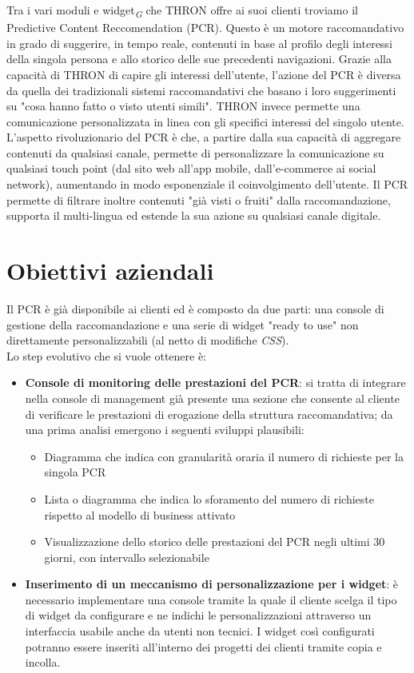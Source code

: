\documentclass[a4paper, 12pt, twoside, openright]{book}
\newcommand{\gloss}[1]{#1\textsubscript{\textit{\tiny{G}}}}
\begin{document}
Tra i vari moduli e \gloss{widget} che THRON offre ai suoi clienti troviamo il Predictive Content Reccomendation (PCR). Questo è un motore raccomandativo in grado di suggerire, in tempo reale, contenuti in base al profilo degli interessi della singola persona e allo storico delle sue precedenti navigazioni. Grazie alla capacità di THRON di capire gli interessi dell'utente, l'azione del PCR è diversa da quella dei tradizionali sistemi raccomandativi che basano i loro suggerimenti su "cosa hanno fatto o visto utenti simili". THRON invece permette una comunicazione personalizzata in linea con gli specifici interessi del singolo utente. L'aspetto rivoluzionario del PCR è che, a partire dalla sua capacità di aggregare contenuti da qualsiasi canale, permette di personalizzare la comunicazione su qualsiasi touch point (dal sito web all'app mobile, dall'e-commerce ai social network), aumentando in modo esponenziale il coinvolgimento dell'utente. Il PCR permette di filtrare inoltre contenuti "già visti o fruiti" dalla raccomandazione, supporta il multi-lingua ed estende la sua azione su qualsiasi canale digitale.

\newpage{}
\section{Obiettivi aziendali}
Il PCR è già disponibile ai clienti ed è composto da due parti: una console di gestione della raccomandazione e una serie di widget "ready to use" non direttamente personalizzabili (al netto di modifiche \textit{CSS}).\\
Lo step evolutivo che si vuole ottenere è:
\begin{itemize}
\item \textbf{Console di monitoring delle prestazioni del PCR}: si tratta di integrare nella console di management già presente una sezione che consente al cliente di verificare le prestazioni di erogazione della struttura raccomandativa; da una prima analisi emergono i seguenti sviluppi plausibili:
	\begin{itemize}
	\item Diagramma che indica con granularità oraria il numero di richieste per la singola PCR
	\item Lista o diagramma che indica lo sforamento del numero di richieste rispetto al modello di business attivato
	\item Visualizzazione dello storico delle prestazioni del PCR negli ultimi 30 giorni, con intervallo selezionabile
	\end{itemize}
\item \textbf{Inserimento di un meccanismo di personalizzazione per i widget}: è necessario implementare una console tramite la quale il cliente scelga il tipo di widget da configurare e ne indichi le personalizzazioni attraverso un interfaccia usabile anche da utenti non tecnici. I widget così configurati potranno essere inseriti all'interno dei progetti dei clienti tramite copia e incolla.
\end{itemize}
\end{document}
